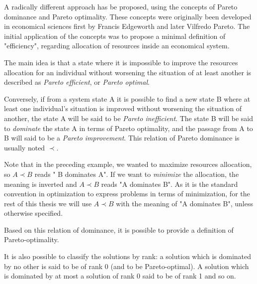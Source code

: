 A radically different approach has be proposed, using the concepts of Pareto dominance and Pareto optimality. These concepts were originally been developed in economical sciences first by Francis Edgeworth and later Vilfredo Pareto. The initial application of the concepts was to propose a minimal definition of "efficiency", regarding allocation of resources inside an economical system.

The main idea is that a state where it is impossible to improve the resources allocation for an individual without worsening the situation of at least another is described as \emph{Pareto efficient}, or \emph{Pareto optimal}.

Conversely, if from a system state A it is possible to find a new state B where at least one individual's situation is improved without worsening the situation of another, the state A will be said to be \emph{Pareto inefficient}. The state B will be said to \emph{dominate} the state A in terms of Pareto optimality, and the passage from A to B will said to be a \emph{Pareto improvement}. This relation of Pareto dominance is usually noted \(\prec\).


Note that in the preceding example, we wanted to maximize resources allocation, so \(A \prec B\) reads " B dominates A". If we want to \emph{minimize} the allocation, the meaning is inverted and  \(A \prec B\) reads "A dominates B".
As it is the standard convention in optimization to express problems in terms of minimization, for the rest of this thesis we will use \(A \prec B\) with the meaning of "A dominates B", unless otherwise specified.

Based on this relation of dominance, it is possible to provide a definition of Pareto-optimality.



It is also possible to classify the solutions by rank: a solution which is dominated by no other is said to be of rank 0 (and to be Pareto-optimal). A solution which is dominated by at most a solution of rank 0 said to be of rank 1 and so on.

